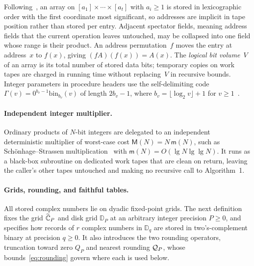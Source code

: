 Following~\cite[\S2]{OAI26}, an array on $[a_1]\times\cdots\times[a_t]$ with $a_i\ge 1$ is stored in lexicographic order with the first coordinate most significant, so addresses are implicit in tape position rather than stored per entry. Adjacent spectator fields, meaning address fields that the current operation leaves untouched, may be collapsed into one field whose range is their product. An address permutation~$f$ moves the entry at address~$x$ to $f(x)$, giving $(fA)(f(x))=A(x)$. The \emph{logical bit volume}~$V$ of an array is its total number of stored data bits; temporary copies on work tapes are charged in running time without replacing~$V$ in recursive bounds. Integer parameters in procedure headers use the self-delimiting code $\Gamma(v)=0^{b_v-1}\mathrm{bin}_{b_v}(v)$ of length $2b_v-1$, where $b_v=\lfloor\log_2 v\rfloor+1$ for $v\ge 1$~\cite[(1)]{OAI26}.

\paragraph{Independent integer multiplier.}
Ordinary products of $N$-bit integers are delegated to an independent deterministic multiplier of worst-case cost $\mathsf M(N)=N\,\mathsf m(N)$, such as Sch\"onhage--Strassen multiplication~\cite{SS71} with $\mathsf m(N)=O(\lg N\lg\lg N)$. It runs as a black-box subroutine on dedicated work tapes that are clean on return, leaving the caller's other tapes untouched and making no recursive call to Algorithm~1.

\paragraph{Grids, rounding, and faithful tables.}
All stored complex numbers lie on dyadic fixed-point grids. The next definition fixes the grid $\widetilde{\mathbb{C}}_P$ and disk grid $\mathbb{D}_P$ at an arbitrary integer precision $P\ge 0$, and specifies how records of $r$ complex numbers in $\mathbb{D}_q$ are stored in two's-complement binary at precision $q\ge 0$. It also introduces the two rounding operators, truncation toward zero $Q_P$ and nearest rounding $\mathcal{Q}_P$, whose bounds~\eqref{eq:rounding} govern where each is used below.

